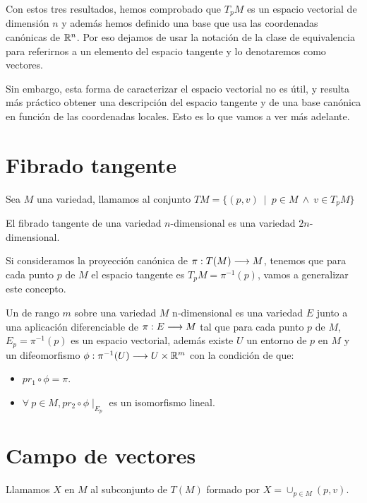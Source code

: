 Con estos tres resultados, hemos comprobado que $T_pM$ es un espacio vectorial de dimensión $n$
y además hemos definido una base que usa las coordenadas canónicas de $\mathbb{R}^n$.
Por eso dejamos de usar la notación de la clase de equivalencia para referirnos a un elemento del
espacio tangente y lo denotaremos como vectores.

Sin embargo, esta forma de caracterizar el espacio vectorial no es útil, y resulta más práctico
obtener una descripción del espacio tangente y de una base canónica en función de las coordenadas
locales.
Esto es lo que vamos a ver más adelante.


\section{Fibrado tangente}\label{sec:fibrado-tangente}
\begin{definition}
  Sea $M$ una variedad, llamamos  al
  conjunto $TM=\{(p,v)\ \mid\ p\in M\ \land\ v\in T_pM\}$
\end{definition}

\begin{proposition}
  El fibrado tangente de una variedad $n$-dimensional es una variedad $2n$-dimensional.
\end{proposition}

Si consideramos la proyección canónica de $\pi:T(M)\longrightarrow M$, tenemos que para cada punto $p$ de
$M$ el espacio tangente es $T_pM=\pi^{-1}(p)$, vamos a generalizar este concepto.

\begin{definition}
  Un  de rango $m$ sobre una variedad $M$
  n-dimensional es una variedad $E$ junto a una aplicación diferenciable de $\pi:E\longrightarrow M$ tal
  que para cada punto $p$ de $M$, $E_p=\pi^{-1}(p)$ es un espacio vectorial, además existe $U$ un
  entorno de $p$ en $M$ y un difeomorfismo $\phi:\pi^{-1}(U)\longrightarrow U\times\mathbb{R}^m$ con la condición
  de que:
  \begin{itemize}
    \item $pr_1\circ\phi=\pi$.
    \item $\forall\ p\in M, pr_2\circ\phi\mid_{E_p}$ es un isomorfismo lineal.
  \end{itemize}
\end{definition}


\section{Campo de vectores}\label{sec:campo-de-vectores}
\begin{definition}
  Llamamos  $X$ en $M$ al subconjunto de $T(M)$ formado por
  $X=\cup_{p\in M}(p,v)$.
\end{definition}

